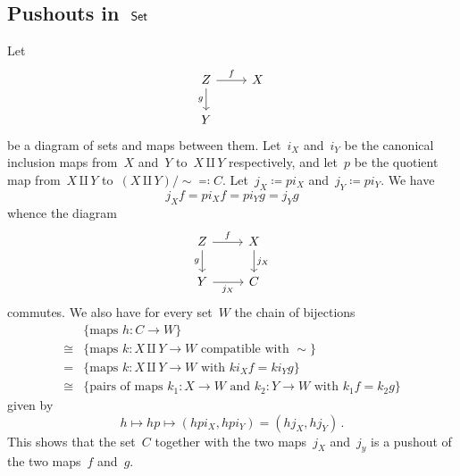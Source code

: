 \subsection{Pushouts in~\texorpdfstring{$\mathsf{Set}$}{Set}}

Let
\[
	\begin{tikzcd}
		Z
		\arrow{r}[above]{f}
		\arrow{d}[left]{g}
		&
		X
		\\
		Y
		&
		{}
	\end{tikzcd}
\]
be a diagram of sets and maps between them.
Let~$i_X$ and~$i_Y$ be the canonical inclusion maps from~$X$ and~$Y$ to~$X ⨿ Y$ respectively, and let~$p$ be the quotient map from~$X ⨿ Y$ to~$(X ⨿ Y) / {∼} ≕ C$.
Let~$j_X ≔ p i_X$ and~$j_Y ≔ p i_Y$.
We have
\[
	j_X f = p i_X f = p i_Y g = j_Y g
\]
whence the diagram
\[
	\begin{tikzcd}
		Z
		\arrow{r}[above]{f}
		\arrow{d}[left]{g}
		&
		X
		\arrow{d}[right]{j_X}
		\\
		Y
		\arrow{r}[below]{j_X}
		&
		C
	\end{tikzcd}
\]
commutes.
We also have for every set~$W$ the chain of bijections
\begin{align*}
	{}&
	\{ \text{maps~$h \colon C \to W$} \} \\
	≅{}&
	\{ \text{maps~$k \colon X ⨿ Y \to W$ compatible with~$∼$} \} \\
	={}&
	\{ \text{maps~$k \colon X ⨿ Y \to W$ with~$k i_X f = k i_Y g$} \} \\
	≅{}&
	\{ \text{pairs of maps~$k_1 \colon X \to W$ and~$k_2 \colon Y \to W$ with~$k_1 f = k_2 g$} \}
\end{align*}
given by
\[
	h \mapsto h p \mapsto (h p i_X, h p i_Y) = (h j_X, h j_Y) \,.
\]
This shows that the set~$C$ together with the two maps~$j_X$ and~$j_y$ is a pushout of the two maps~$f$ and~$g$.
